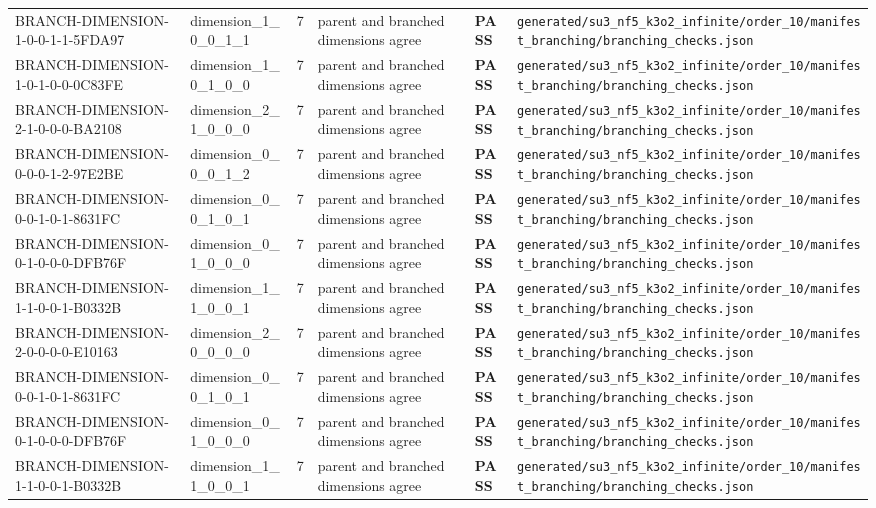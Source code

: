 \documentclass[11pt]{article}
\newcommand{\Pass}{\textcolor{green!50!black}{\textbf{PASS}}}
\newcommand{\RawPath}[1]{\texttt{#1}}
\begin{document}
\begin{longtable}{p{3cm}p{2.5cm}r p{3cm}l p{2cm}}
BRANCH-DIMENSION-1-0-0-1-1-5FDA97 & dimension\_1\_0\_0\_1\_1 & 7 & parent and branched dimensions agree & \Pass & \RawPath{generated/su3\_nf5\_k3o2\_infinite/order\_10/manifest\_branching/branching\_checks.json}\\
BRANCH-DIMENSION-1-0-1-0-0-0C83FE & dimension\_1\_0\_1\_0\_0 & 7 & parent and branched dimensions agree & \Pass & \RawPath{generated/su3\_nf5\_k3o2\_infinite/order\_10/manifest\_branching/branching\_checks.json}\\
BRANCH-DIMENSION-2-1-0-0-0-BA2108 & dimension\_2\_1\_0\_0\_0 & 7 & parent and branched dimensions agree & \Pass & \RawPath{generated/su3\_nf5\_k3o2\_infinite/order\_10/manifest\_branching/branching\_checks.json}\\
BRANCH-DIMENSION-0-0-0-1-2-97E2BE & dimension\_0\_0\_0\_1\_2 & 7 & parent and branched dimensions agree & \Pass & \RawPath{generated/su3\_nf5\_k3o2\_infinite/order\_10/manifest\_branching/branching\_checks.json}\\
BRANCH-DIMENSION-0-0-1-0-1-8631FC & dimension\_0\_0\_1\_0\_1 & 7 & parent and branched dimensions agree & \Pass & \RawPath{generated/su3\_nf5\_k3o2\_infinite/order\_10/manifest\_branching/branching\_checks.json}\\
BRANCH-DIMENSION-0-1-0-0-0-DFB76F & dimension\_0\_1\_0\_0\_0 & 7 & parent and branched dimensions agree & \Pass & \RawPath{generated/su3\_nf5\_k3o2\_infinite/order\_10/manifest\_branching/branching\_checks.json}\\
BRANCH-DIMENSION-1-1-0-0-1-B0332B & dimension\_1\_1\_0\_0\_1 & 7 & parent and branched dimensions agree & \Pass & \RawPath{generated/su3\_nf5\_k3o2\_infinite/order\_10/manifest\_branching/branching\_checks.json}\\
BRANCH-DIMENSION-2-0-0-0-0-E10163 & dimension\_2\_0\_0\_0\_0 & 7 & parent and branched dimensions agree & \Pass & \RawPath{generated/su3\_nf5\_k3o2\_infinite/order\_10/manifest\_branching/branching\_checks.json}\\
BRANCH-DIMENSION-0-0-1-0-1-8631FC & dimension\_0\_0\_1\_0\_1 & 7 & parent and branched dimensions agree & \Pass & \RawPath{generated/su3\_nf5\_k3o2\_infinite/order\_10/manifest\_branching/branching\_checks.json}\\
BRANCH-DIMENSION-0-1-0-0-0-DFB76F & dimension\_0\_1\_0\_0\_0 & 7 & parent and branched dimensions agree & \Pass & \RawPath{generated/su3\_nf5\_k3o2\_infinite/order\_10/manifest\_branching/branching\_checks.json}\\
BRANCH-DIMENSION-1-1-0-0-1-B0332B & dimension\_1\_1\_0\_0\_1 & 7 & parent and branched dimensions agree & \Pass & \RawPath{generated/su3\_nf5\_k3o2\_infinite/order\_10/manifest\_branching/branching\_checks.json}\\

\end{longtable}
\end{document}
